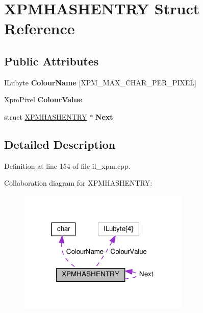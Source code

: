 \hypertarget{structXPMHASHENTRY}{}\section{X\+P\+M\+H\+A\+S\+H\+E\+N\+T\+RY Struct Reference}
\label{structXPMHASHENTRY}
\subsection*{Public Attributes}
\begin{DoxyCompactItemize}
\item 
\mbox{\label{structXPMHASHENTRY_a8a0e96a574a0b292cd5dfeefffe5e3a2}} 
I\+Lubyte {\bfseries Colour\+Name} \mbox{[}X\+P\+M\+\_\+\+M\+A\+X\+\_\+\+C\+H\+A\+R\+\_\+\+P\+E\+R\+\_\+\+P\+I\+X\+EL\mbox{]}
\item 
\mbox{\label{structXPMHASHENTRY_a4dcb5591fd4048d549ead4dd0114590f}} 
Xpm\+Pixel {\bfseries Colour\+Value}
\item 
\mbox{\label{structXPMHASHENTRY_a165c0c800b7985e6427a119ac859ec8a}} 
struct \hyperlink{structXPMHASHENTRY}{X\+P\+M\+H\+A\+S\+H\+E\+N\+T\+RY} $\ast$ {\bfseries Next}
\end{DoxyCompactItemize}


\subsection{Detailed Description}


Definition at line 154 of file il\+\_\+xpm.\+cpp.



Collaboration diagram for X\+P\+M\+H\+A\+S\+H\+E\+N\+T\+RY\+:
\nopagebreak
\begin{figure}[H]
\begin{center}
\leavevmode
\includegraphics[width=231pt]{d5/dfa/structXPMHASHENTRY__coll__graph}
\end{center}
\end{figure}



